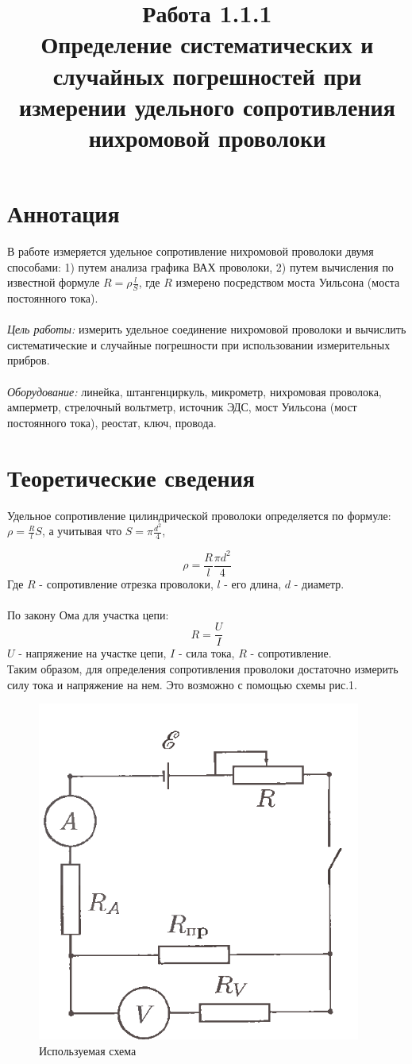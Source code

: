 \documentclass{article}
\title{Работа 1.1.1\\ 
	Определение систематических и случайных погрешностей при измерении удельного сопротивления нихромовой проволоки}
\begin{document}
	
	\maketitle
	
	\section{Аннотация}
	В работе измеряется удельное сопротивление нихромовой проволоки двумя способами: 1) путем анализа графика ВАХ проволоки, 2) путем вычисления по известной формуле \(R = \rho \frac{l}{S}\), где \( R\) измерено  посредством моста Уильсона (моста постоянного тока).\\\\
	\emph{Цель работы:} измерить удельное соединение нихромовой проволоки и вычислить систематические и случайные погрешности при использовании измерительных прибров. \\\\
	\emph{Оборудование:} линейка, штангенциркуль, микрометр, нихромовая проволока, амперметр, стрелочный вольтметр, источник ЭДС, мост Уильсона (мост постоянного тока), реостат, ключ, провода.
	
	\section{Теоретические сведения}
	
	Удельное сопротивление цилиндрической проволоки определяется по формуле:
	$ \rho = \frac{R}{l}S $, а учитывая что $ S = {\pi}{\frac{d^2}{4}} $,
	
	$$ \rho = \frac{R}{l}{\frac{{\pi}d^2}{4}} $$
	Где $ R $ - сопротивление отрезка проволоки, $ l $ - его длина, $ d $ - диаметр.\\\\
	По закону Ома для участка цепи: 
	$$ R = \frac{U}{I} $$
	$ U $ - напряжение на участке цепи, $ I $ - сила тока, $ R $ - сопротивление.\\
	
	Таким образом, для определения сопротивления проволоки достаточно измерить силу тока и напряжение на нем. Это возможно с помощью схемы рис.1.\\
	\begin{figure}
		\centering
		\includegraphics[width = 0.5\linewidth]{1.png}
		\caption{Используемая схема}
		\label{fig:enter-label}
	\end{figure}
	
\end{document}
